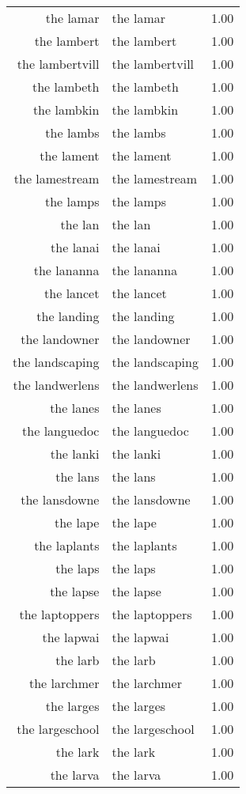 \begin{table}[ht]
\begin{tabular}{rlr}
  the lamar & the lamar & 1.00 \\ 
  the lambert & the lambert & 1.00 \\ 
  the lambertvill & the lambertvill & 1.00 \\ 
  the lambeth & the lambeth & 1.00 \\ 
  the lambkin & the lambkin & 1.00 \\ 
  the lambs & the lambs & 1.00 \\ 
  the lament & the lament & 1.00 \\ 
  the lamestream & the lamestream & 1.00 \\ 
  the lamps & the lamps & 1.00 \\ 
  the lan & the lan & 1.00 \\ 
  the lanai & the lanai & 1.00 \\ 
  the lananna & the lananna & 1.00 \\ 
  the lancet & the lancet & 1.00 \\ 
  the landing & the landing & 1.00 \\ 
  the landowner & the landowner & 1.00 \\ 
  the landscaping & the landscaping & 1.00 \\ 
  the landwerlens & the landwerlens & 1.00 \\ 
  the lanes & the lanes & 1.00 \\ 
  the languedoc & the languedoc & 1.00 \\ 
  the lanki & the lanki & 1.00 \\ 
  the lans & the lans & 1.00 \\ 
  the lansdowne & the lansdowne & 1.00 \\ 
  the lape & the lape & 1.00 \\ 
  the laplants & the laplants & 1.00 \\ 
  the laps & the laps & 1.00 \\ 
  the lapse & the lapse & 1.00 \\ 
  the laptoppers & the laptoppers & 1.00 \\ 
  the lapwai & the lapwai & 1.00 \\ 
  the larb & the larb & 1.00 \\ 
  the larchmer & the larchmer & 1.00 \\ 
  the larges & the larges & 1.00 \\ 
  the largeschool & the largeschool & 1.00 \\ 
  the lark & the lark & 1.00 \\ 
  the larva & the larva & 1.00 \\ 

\end{tabular}
\end{table}
